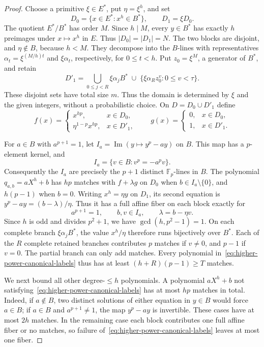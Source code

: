 \begin{proof}
Choose a primitive $\xi\in E^*$, put $\eta=\xi^h$, and set
\[
 D_0=\{x\in E^*:x^h\in B^*\},\qquad D_1=\xi D_0.
\]
The quotient $E^*/B^*$ has order $M$. Since $h\mid M$, every
$y\in B^*$ has exactly $h$ preimages under $x\mapsto x^h$ in $E$.
Thus $|D_0|=|D_1|=N$. The two blocks are disjoint, and $\eta\notin B$,
because $h<M$. They decompose into the $B$-lines with representatives
$\alpha_t=\xi^{(M/h)t}$ and $\xi\alpha_t$, respectively, for
$0\le t<h$. Put $z_0=\xi^M$, a generator of $B^*$, and retain
\[
 D'_1=\bigcup_{0\le j<R}\xi\alpha_jB^*
 \;\cup\;\{\xi\alpha_Rz_0^v:0\le v<\tau\}.
\]
These disjoint sets have total size $m$. Thus the domain is determined
by $\xi$ and the given integers, without a probabilistic choice.
On $D=D_0\cup D'_1$ define
\[
 f(x)=
 \begin{cases}x^{hp},&x\in D_0,\\
 \eta^{1-p}x^{hp},&x\in D'_1,
 \end{cases}
 \qquad
 g(x)=\begin{cases}0,&x\in D_0,\\1,&x\in D'_1.\end{cases}
\]

For $a\in B$ with $a^{p+1}=1$, let
$I_a=\operatorname{Im}(y\mapsto y^p-ay)$ on $B$. This map has a
$p$-element kernel, and
\[
 I_a=\{v\in B:v^p=-a^pv\}.
\]
Consequently the $I_a$ are precisely the $p+1$ distinct
$\mathbb F_p$-lines in $B$. The polynomial $q_{a,b}=aX^h+b$ has
$hp$ matches with $f+\lambda g$ on $D_0$ when $b\in I_a\setminus\{0\}$,
and $h(p-1)$ when $b=0$. Writing $x^h=\eta y$ on $D_1$, its second
equation is $y^p-ay=(b-\lambda)/\eta$. Thus it has a full affine
fiber on each block exactly for
\begin{equation}\label{eq:higher-power-canonical-labels}
 a^{p+1}=1,\qquad b,v\in I_a,\qquad \lambda=b-\eta v.
\end{equation}
Since $h$ is odd and divides $p^2+1$, we have
$\gcd(h,p^2-1)=1$. On each complete branch $\xi\alpha_jB^*$,
the value $x^h/\eta$ therefore runs bijectively over $B^*$.
Each of the $R$ complete retained branches contributes $p$ matches
if $v\ne0$, and $p-1$ if $v=0$. The partial branch can only add matches.
Every polynomial in~\eqref{eq:higher-power-canonical-labels}
thus has at least $(h+R)(p-1)\ge T$ matches.

We next bound all other degree-$\le h$ polynomials. A polynomial
$aX^h+b$ not satisfying~\eqref{eq:higher-power-canonical-labels} has
at most $hp$ matches in total. Indeed, if $a\notin B$, two distinct
solutions of either equation in $y\in B$ would force $a\in B$;
if $a\in B$ and $a^{p+1}\ne1$, the map $y^p-ay$ is invertible.
These cases have at most $2h$ matches. In the remaining case each
block contributes one full affine fiber or no matches, so failure
of~\eqref{eq:higher-power-canonical-labels} leaves at most one fiber.


\end{proof}
